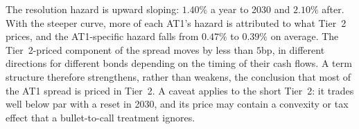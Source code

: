 The resolution hazard is upward sloping: $1.40\%$ a year to 2030 and $2.10\%$ after. With
the steeper curve, more of each AT1's hazard is attributed to what Tier~2 prices, and the
AT1-specific hazard falls from $0.47\%$ to $0.39\%$ on average. The Tier~2-priced component
of the spread moves by less than $5$bp, in different directions for different bonds
depending on the timing of their cash flows. A term structure therefore strengthens, rather
than weakens, the conclusion that most of the AT1 spread is priced in Tier~2. A caveat
applies to the short Tier~2: it trades well below par with a reset in 2030, and its price
may contain a convexity or tax effect that a bullet-to-call treatment ignores.